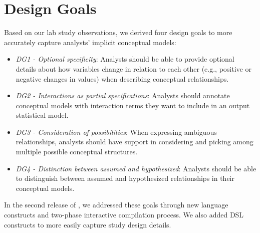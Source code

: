 \section{Design Goals} \label{sec:rtisane_design_implications} 
Based on our lab study observations, we derived four design goals to more accurately capture analysts' implicit
conceptual models: 

\def\optionalSpecificity{\textit{DG1 - Optional specificity}\xspace}
\def\interactionAsPartialSpec{\textit{DG2 - Interactions as partial specifications}\xspace}
\def\considerPossibilities{\textit{DG3 - Consideration of possibilities}\xspace}
\def\assumeHypothesize{\textit{DG4 - Distinction between assumed and hypothesized}\xspace}
\begin{itemize}
    \item \optionalSpecificity: Analysts should be able to provide optional
    details about how variables change in relation to each other (e.g., positive
    or negative changes in values) when describing conceptual relationships.
    \item \interactionAsPartialSpec: Analysts should annotate conceptual models with interaction terms they want to include in an output statistical model. 
    \item \considerPossibilities: When expressing ambiguous relationships, analysts should have support
    in considering and picking among multiple possible conceptual structures.
    \item \assumeHypothesize: Analysts should be able to distinguish between assumed and hypothesized relationships in their conceptual models. 
\end{itemize}

In the second release of \tisane, we addressed these goals through new language
constructs and two-phase interactive compilation process. We also added DSL constructs to more easily capture
study design details. 

